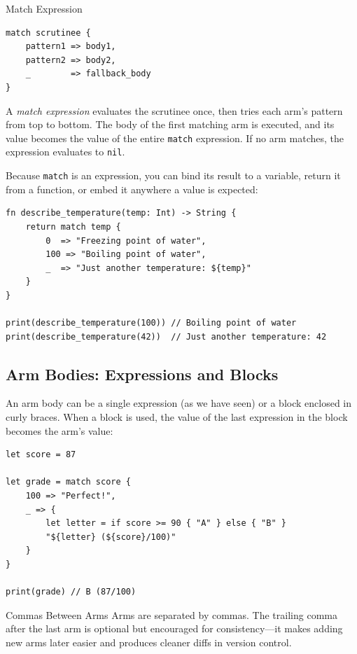 \begin{defnbox}{Match Expression}
\begin{lstlisting}[language=Lattice, numbers=none]
match scrutinee {
    pattern1 => body1,
    pattern2 => body2,
    _        => fallback_body
}
\end{lstlisting}
A \emph{match expression} evaluates the scrutinee once, then tries each arm's pattern from top to bottom. The body of the first matching arm is executed, and its value becomes the value of the entire \lstinline|match| expression. If no arm matches, the expression evaluates to \lstinline|nil|.
\end{defnbox}

Because \lstinline|match| is an expression, you can bind its result to a variable, return it from a function, or embed it anywhere a value is expected:

\begin{lstlisting}[language=Lattice, caption={match as an expression}]
fn describe_temperature(temp: Int) -> String {
    return match temp {
        0  => "Freezing point of water",
        100 => "Boiling point of water",
        _  => "Just another temperature: ${temp}"
    }
}

print(describe_temperature(100)) // Boiling point of water
print(describe_temperature(42))  // Just another temperature: 42
\end{lstlisting}

\subsection{Arm Bodies: Expressions and Blocks}\label{sec:match-arm-bodies}

An arm body can be a single expression (as we have seen) or a block enclosed in curly braces. When a block is used, the value of the last expression in the block becomes the arm's value:

\begin{lstlisting}[language=Lattice, caption={Block bodies in match arms}]
let score = 87

let grade = match score {
    100 => "Perfect!",
    _ => {
        let letter = if score >= 90 { "A" } else { "B" }
        "${letter} (${score}/100)"
    }
}

print(grade) // B (87/100)
\end{lstlisting}

\begin{tipbox}{Commas Between Arms}
Arms are separated by commas. The trailing comma after the last arm is optional but encouraged for consistency---it makes adding new arms later easier and produces cleaner diffs in version control.
\end{tipbox}

